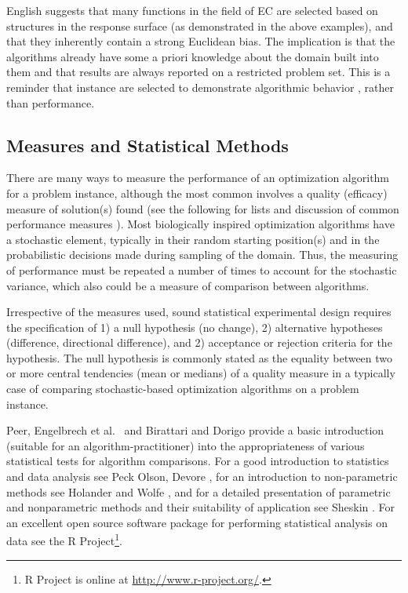 English \cite{English1996} suggests that many functions in the field of EC are selected based on structures in the response surface (as demonstrated in the above examples), and that they inherently contain a strong Euclidean bias. The implication is that the algorithms already have some a priori knowledge about the domain built into them and that results are always reported on a restricted problem set. This is a reminder that instance are selected to demonstrate algorithmic behavior , rather than performance.

% 
% 
\subsection{Measures and Statistical Methods}
There are many ways to measure the performance of an optimization algorithm for a problem instance, although the most common involves a quality (efficacy) measure of solution(s) found (see the following for lists and discussion of common performance measures \cite{Bartz-Beielstein2004, Birattari2005a, Hughes2006, Eiben2002, Barr1995}). Most biologically inspired optimization algorithms have a stochastic element, typically in their random starting position(s) and in the probabilistic decisions made during sampling of the domain. Thus, the measuring of performance must be repeated a number of times to account for the stochastic variance, which also could be a measure of comparison between algorithms.

Irrespective of the measures used, sound statistical experimental design requires the specification of 1) a null hypothesis (no change), 2) alternative hypotheses (difference, directional difference), and 2) acceptance or rejection criteria for the hypothesis. The null hypothesis is commonly stated as the equality between two or more central tendencies (mean or medians) of a quality measure in a typically case	of comparing stochastic-based optimization algorithms on a problem instance.

Peer, Engelbrech et al.\ \cite{Peer2003} and Birattari and Dorigo \cite{Birattari2005a} provide a basic introduction (suitable for an algorithm-practitioner) into the appropriateness of various statistical tests for algorithm comparisons. For a good introduction to statistics and data analysis see Peck Olson, Devore \cite{Peck2005}, for an introduction to non-parametric methods see Holander and Wolfe \cite{Hollander1999}, and for a detailed presentation of parametric and nonparametric methods and their suitability of application see Sheskin \cite{Hughes2006}. For an excellent open source software package for performing statistical analysis on data see the R Project\footnote{R Project is online at \url{http://www.r-project.org/}.}.

